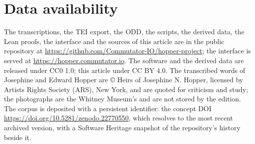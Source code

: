 \documentclass[11pt]{article}
\begin{document}
\section*{Data availability}

The transcriptions, the TEI export, the ODD, the scripts, the derived data, the Lean proofs, the interface and the sources of this article are in the public repository at \url{https://github.com/Commutator-IO/hopper-project}; the interface is served at \url{https://hopper.commutator.io}. The software and the derived data are released under CC0 1.0; this article under CC BY 4.0. The transcribed words of Josephine and Edward Hopper are © Heirs of Josephine N. Hopper, licensed by Artists Rights Society (ARS), New York, and are quoted for criticism and study; the photographs are the Whitney Museum's and are not stored by the edition. The corpus is deposited with a persistent identifier: the concept DOI \url{https://doi.org/10.5281/zenodo.22770550}, which resolves to the most recent archived version, with a Software Heritage snapshot of the repository's history beside it.
\end{document}
